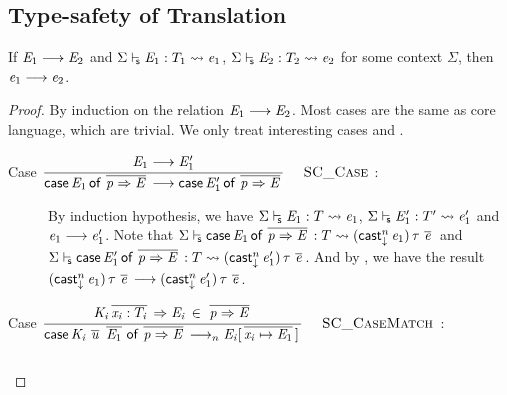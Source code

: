 \subsection{Type-safety of Translation}
\begin{lem}\label{lem:appendix:src:redtr}
If $\mathit{E_{{\mathrm{1}}}}  \longrightarrow  \mathit{E_{{\mathrm{2}}}}$ and $ \Sigma  \vdash_{\!\!\mathsf{s} }  \mathit{E_{{\mathrm{1}}}}  :  T_{{\mathrm{1}}}   \rightsquigarrow   \mathit{e_{{\mathrm{1}}}} $, $ \Sigma  \vdash_{\!\!\mathsf{s} }  \mathit{E_{{\mathrm{2}}}}  :  T_{{\mathrm{2}}}   \rightsquigarrow   \mathit{e_{{\mathrm{2}}}} $ for some context $\Sigma$, then $\mathit{e_{{\mathrm{1}}}}  \longrightarrow  \mathit{e_{{\mathrm{2}}}}$.
\end{lem}

\begin{proof}
    By induction on the relation $\mathit{E_{{\mathrm{1}}}}  \longrightarrow  \mathit{E_{{\mathrm{2}}}}$. Most cases are the same as core language, which are trivial. We only treat interesting cases  and .
    \begin{description}
        \item[Case \scriptsize{${\displaystyle\frac{\begin{array}{l} {\mathit{E_{{\mathrm{1}}}} \longrightarrow \mathit{E'_{{\mathrm{1}}}}} \end{array}}{ \mathsf{case} \, \mathit{E_{{\mathrm{1}}}} \, \mathsf{of} \, \,\overline{ \mathit{p} \Rightarrow \mathit{E} }\, \longrightarrow \mathsf{case} \, \mathit{E'_{{\mathrm{1}}}} \, \mathsf{of} \, \,\overline{ \mathit{p} \Rightarrow \mathit{E} }\,}\quad\textsc{ {\textsc{SC\_Case}}{} }}$}:] $\quad$ \\
        By induction hypothesis, we have $ \Sigma  \vdash_{\!\!\mathsf{s} }  \mathit{E_{{\mathrm{1}}}}  :  T   \rightsquigarrow   \mathit{e_{{\mathrm{1}}}} $, $ \Sigma  \vdash_{\!\!\mathsf{s} }  \mathit{E'_{{\mathrm{1}}}}  :  T'   \rightsquigarrow   \mathit{e'_{{\mathrm{1}}}} $ and $\mathit{e_{{\mathrm{1}}}}  \longrightarrow  \mathit{e'_{{\mathrm{1}}}}$. Note that $ \Sigma  \vdash_{\!\!\mathsf{s} }  \mathsf{case} \, \mathit{E_{{\mathrm{1}}}} \, \mathsf{of} \, \,\overline{  \mathit{p}  \Rightarrow  \mathit{E}  }\,  :  T   \rightsquigarrow   (  \mathsf{cast}_{\downarrow}^n \, \mathit{e_{{\mathrm{1}}}}  ) \, \tau \, \,\overline{  \mathit{e}  }\, $ and $ \Sigma  \vdash_{\!\!\mathsf{s} }  \mathsf{case} \, \mathit{E'_{{\mathrm{1}}}} \, \mathsf{of} \, \,\overline{  \mathit{p}  \Rightarrow  \mathit{E}  }\,  :  T   \rightsquigarrow   (  \mathsf{cast}_{\downarrow}^n \, \mathit{e'_{{\mathrm{1}}}}  ) \, \tau \, \,\overline{  \mathit{e}  }\, $. And by , we have the result $(  \mathsf{cast}_{\downarrow}^n \, \mathit{e_{{\mathrm{1}}}}  ) \, \tau \, \,\overline{  \mathit{e}  }\,  \longrightarrow  (  \mathsf{cast}_{\downarrow}^n \, \mathit{e'_{{\mathrm{1}}}}  ) \, \tau \, \,\overline{  \mathit{e}  }\,$.
        \item[Case \scriptsize{${\displaystyle\frac{\begin{array}{l} {\mathit{K_{\mathit{i}}} \,\overline{ \mathit{x_{\mathit{i}}} : T_{\mathit{i}} }\, \Rightarrow \mathit{E_{\mathit{i}}} \, \in \, \,\overline{ \mathit{p} \Rightarrow \mathit{E} }\,} \end{array}}{ \mathsf{case} \, \mathit{K_{\mathit{i}}} \, \,\overline{ \mathit{u} }\, \, \,\overline{ \mathit{E_{{\mathrm{1}}}} }\, \, \mathsf{of} \, \,\overline{ \mathit{p} \Rightarrow \mathit{E} }\, \longrightarrow_n \mathit{E_{\mathit{i}}} [ \,\overline{ \mathit{x_{\mathit{i}}} \mapsto \mathit{E_{{\mathrm{1}}}} }\, ] \,}\quad\textsc{ {\textsc{SC\_CaseMatch}}{} }}$}:] $\quad$ \\

\end{description}
\end{proof}
